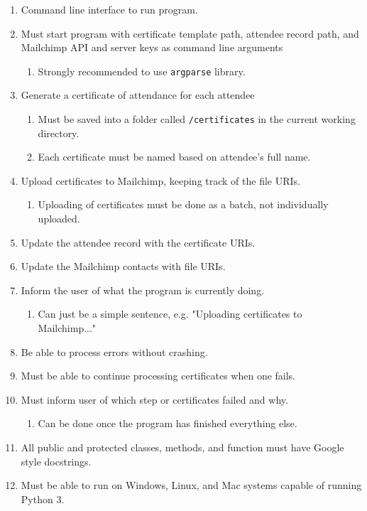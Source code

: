 \documentclass[11pt]{article}
\begin{document}
\begin{enumerate}
    \item Command line interface to run program.
    \item Must start program with certificate template path, attendee record path, and Mailchimp API and server keys as command line arguments
    \begin{enumerate}
        \item Strongly recommended to use \texttt{argparse} library.
    \end{enumerate}
    \item Generate a certificate of attendance for each attendee
    \begin{enumerate}
        \item Must be saved into a folder called \texttt{/certificates} in the current working directory.
        \item Each certificate must be named based on attendee's full name.
    \end{enumerate}
    \item Upload certificates to Mailchimp, keeping track of the file URIs.
    \begin{enumerate}
        \item Uploading of certificates must be done as a batch, not individually uploaded.
    \end{enumerate}
    \item Update the attendee record with the certificate URIs.
    \item Update the Mailchimp contacts with file URIs.
    \item Inform the user of what the program is currently doing.
    \begin{enumerate}
        \item Can just be a simple sentence, e.g. "Uploading certificates to Mailchimp..."
    \end{enumerate}
    \item Be able to process errors without crashing.
    \item Must be able to continue processing certificates when one fails.
    \item Must inform user of which step or certificates failed and why.
    \begin{enumerate}
        \item Can be done once the program has finished everything else.
    \end{enumerate}
    \item All public and protected classes, methods, and function must have Google style docstrings.
    \item Must be able to run on Windows, Linux, and Mac systems capable of running Python 3.
\end{enumerate}
\end{document}
